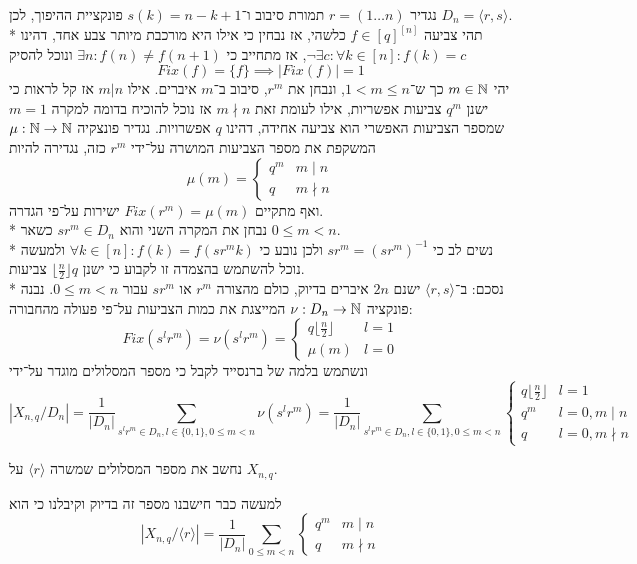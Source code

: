 נגדיר $r = (1 \dots n)$ תמורת סיבוב ו־$s(k) = n - k + 1$ פונקציית ההיפוך, לכן $D_n = \langle r, s \rangle$. \\*
תהי צביעה $f \in {[q]}^{[n]}$ כלשהי, אז נבחין כי אילו היא מורכבת מיותר צבע אחד, דהינו $\lnot \exists c : \forall k \in [n] : f(k) = c$, אז מתחייב כי $\exists n : f(n) \ne f(n + 1)$ ונוכל להסיק
\[
	Fix(f) = \{ f\} \implies |Fix(f)| = 1
\]
יהי $m \in \mathbb{N}$ כך ש־$1 < m \le n$, ונבחן את $r^m$, סיבוב ב־$m$ איברים.
אילו $m \big| n$ אז קל לראות כי ישנן $q^m$ צביעות אפשריות, אילו לעומת זאת $m \nmid n$ אז נוכל להוכיח בדומה למקרה $m = 1$ שמספר הצביעות האפשרי הוא צביעה אחידה, דהינו $q$ אפשרויות.
נגדיר פונצקיה $\mu : \mathbb{N} \to \mathbb{N}$ המשקפת את מספר הצביעות המושרה על־ידי $r^m$ כזה, נגדירה להיות
\[
	\mu(m) = \begin{cases}
		q^m & m \mid n \\
		q & m \nmid n
	\end{cases}
\]
ואף מתקיים $Fix(r^m) = \mu(m)$ ישירות על־פי הגדרה. \\*
נבחן את המקרה השני והוא $s r^m \in D_n$ כשאר $0 \le m < n$. \\*
נשים לב כי $sr^m = {(sr^m)}^{-1}$ ולכן נובע כי $\forall k \in [n] : f(k) = f(sr^m k)$ ולמעשה נוכל להשתמש בהצמדה זו לקבוע כי ישנן $\lfloor \frac{n}{2} \rfloor q$ צביעות. \\*
נסכם:
ב־$\langle r, s \rangle$ ישנם $2n$ איברים בדיוק, כולם מהצורה $r^m$ או $s r^m$ עבור $0 \le m < n$. נבנה פונקציה $\nu : D_n \to \mathbb{N}$ המייצגת את כמות הצביעות על־פי פעולה מהחבורה:
\[
	Fix(s^l r^m) = \nu(s^l r^m) = \begin{cases}
		q \lfloor \frac{n}{2} \rfloor & l = 1 \\
		\mu(m) & l = 0
	\end{cases}
\]
ונשתמש בלמה של ברנסייד לקבל כי מספר המסלולים מוגדר על־ידי
\[
	|X_{n, q} / D_n| = \frac{1}{|D_n|} \sum_{s^l r^m \in D_n, l \in \{0, 1\}, 0 \le m < n} \nu(s^l r^m)
	= \frac{1}{|D_n|} \sum_{s^l r^m \in D_n, l \in \{0, 1\}, 0 \le m < n} \begin{cases}
		q \lfloor \frac{n}{2} \rfloor & l = 1 \\
		q^m & l = 0, m \mid n \\
		q & l = 0, m \nmid n
	\end{cases}
\]

\Subquestion{}
נחשב את מספר המסלולים שמשרה $\langle r \rangle$ על $X_{n, q}$.

למעשה כבר חישבנו מספר זה בדיוק וקיבלנו כי הוא
\[
	|X_{n, q} / \langle r \rangle |
	= \frac{1}{|D_n|} \sum_{0 \le m < n} \begin{cases}
		q^m & m \mid n \\
		q & m \nmid n
	\end{cases}
\]

